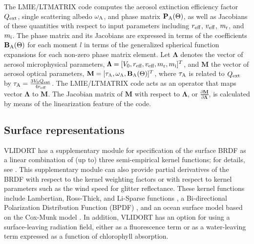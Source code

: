 The LMIE/LTMATRIX code computes the aerosol extinction efficiency
factor $Q_\text{ext}$, single scattering albedo $\omega_\text{A}$, and phase matrix 
$\mathbf{P}_\text{A}(\Theta)$, as well as Jacobians of these quantities with respect
to input parameters including $r_\text{eff}$, $v_\text{eff}$, $m_\text{r}$, and $m_\text{i}$.
The phase matrix and its Jacobians are expressed in terms of the
coefficients $\mathbf{B}_\text{A}(\Theta)$ for each moment $l$ in terms of the 
generalized spherical function expansions
for each non-zero phase matrix element. Let $\pmb{\Lambda}$ denotes the
vector of aerosol microphysical parameters, 
$\pmb{\Lambda}=[V_0,r_\text{eff},v_\text{eff},m_\text{r},m_\text{i}]^T$, and $\mathbf{M}$
the vector of aerosol optical parameters, 
$\mathbf{M}=[\tau_\text{A},\omega_\text{A},\mathbf{B}_\text{A}(\Theta)]^T$, 
where $\tau_\text{A}$ is related to $Q_\text{ext}$ by 
$\tau_\text{A}=\frac{3V_0 Q_\text{ext}}{4r_\text{eff}}$. The LMIE/LTMATRIX code acts
as an operator that maps vector $\pmb{\Lambda}$ to $\mathbf{M}$. 
The Jacobian matrix of $\mathbf{M}$ with respect to $\pmb{\Lambda}$, or
$\frac{\partial\mathbf{M}}{\partial\pmb{\Lambda}}$, is calculated by 
means of the linearization feature of the code.

\subsection{Surface representations} \label{subsec:surface}

VLIDORT has a supplementary module for specification of the surface BRDF
as a linear combination of (up to) three semi-empirical kernel
functions; for details, see \citet{Spurr04}. This supplementary module can also
provide partial derivatives of the BRDF with respect to the kernel
weighting factors or with respect to kernel parameters such as the wind
speed for glitter reflectance. These kernel functions include
Lambertian, Ross-Thick, and Li-Sparse functions \citep{Wanner95, Lucht00}, a
Bi-directional Polarization Distribution Function (BPDF)
\citep{Maignan09}, and an ocean surface model based on the 
Cox-Munk model \citep{Cox54}. In addition, VLIDORT has
an option for using a surface-leaving radiation field, either as a
fluorescence term or as a water-leaving term expressed as a function of
chlorophyll absorption.

